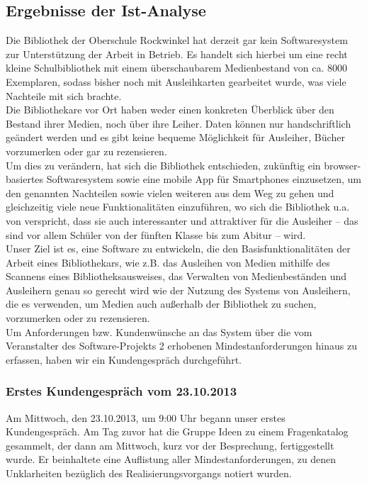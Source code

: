 \documentclass[fontsize=12pt,paper=a4,twoside]{scrartcl}
\begin{document}
\subsection{Ergebnisse der Ist-Analyse}

Die Bibliothek der Oberschule Rockwinkel hat derzeit gar kein Softwaresystem zur Unterstützung der Arbeit in Betrieb. Es handelt sich hierbei um eine recht kleine Schulbibliothek mit einem überschaubarem Medienbestand von ca. 8000 Exemplaren, sodass bisher noch mit Ausleihkarten gearbeitet wurde, was viele Nachteile mit sich brachte. \\
Die Bibliothekare vor Ort haben weder einen konkreten Überblick über den Bestand ihrer Medien, noch über ihre Leiher. Daten können nur handschriftlich geändert werden und es gibt keine bequeme Möglichkeit für Ausleiher, Bücher vorzumerken oder gar zu rezensieren. \\
Um dies zu verändern, hat sich die Bibliothek entschieden, zukünftig ein browser-basiertes Softwaresystem sowie eine mobile App für Smartphones einzusetzen, um den genannten Nachteilen sowie vielen weiteren aus dem Weg zu gehen und gleichzeitig viele neue Funktionalitäten einzuführen, wo sich die Bibliothek u.a. von verspricht, dass sie auch interessanter und attraktiver für die Ausleiher  -- das sind vor allem Schüler von der fünften Klasse bis zum Abitur -- wird. \\
Unser Ziel ist es, eine Software zu entwickeln, die den Basisfunktionalitäten der Arbeit eines Bibliothekars, wie z.B. das Ausleihen von Medien mithilfe des Scannens eines Bibliotheksausweises, das Verwalten von Medienbeständen und Ausleihern genau so gerecht wird wie der Nutzung des Systems von Ausleihern, die es verwenden, um Medien auch außerhalb der Bibliothek zu suchen, vorzumerken oder zu rezensieren. \\
Um Anforderungen bzw. Kundenwünsche an das System über die vom Veranstalter des Software-Projekts 2 erhobenen Mindestanforderungen hinaus zu erfassen, haben wir ein Kundengespräch durchgeführt.

\subsubsection{Erstes Kundengespräch vom 23.10.2013} \label{kundengesp}

Am Mittwoch, den 23.10.2013, um 9:00 Uhr begann unser erstes Kundengespräch.
Am Tag zuvor hat die Gruppe Ideen zu einem Fragenkatalog gesammelt, der dann
am Mittwoch, kurz vor der Besprechung, fertiggestellt wurde. Er beinhaltete
eine Auflistung aller Mindestanforderungen, zu denen Unklarheiten bezüglich 
des Realisierungsvorgangs notiert wurden. 
\end{document}
